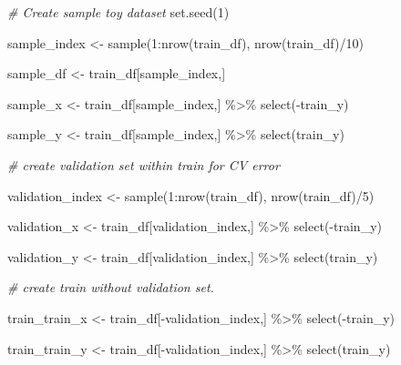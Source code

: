 \documentclass[
]{article}
\newenvironment{Shaded}{\begin{snugshade}}{\end{snugshade}}
\newcommand{\CommentTok}[1]{\textcolor[rgb]{0.56,0.35,0.01}{\textit{#1}}}
\newcommand{\DecValTok}[1]{\textcolor[rgb]{0.00,0.00,0.81}{#1}}
\newcommand{\FunctionTok}[1]{\textcolor[rgb]{0.00,0.00,0.00}{#1}}
\newcommand{\NormalTok}[1]{#1}
\newcommand{\OtherTok}[1]{\textcolor[rgb]{0.56,0.35,0.01}{#1}}
\newcommand{\SpecialCharTok}[1]{\textcolor[rgb]{0.00,0.00,0.00}{#1}}
\begin{document}
\begin{Shaded}
\begin{Highlighting}[]
\CommentTok{\# Create \textquotesingle{}sample\textquotesingle{} toy dataset }
\FunctionTok{set.seed}\NormalTok{(}\DecValTok{1}\NormalTok{)}

\NormalTok{sample\_index }\OtherTok{\textless{}{-}} \FunctionTok{sample}\NormalTok{(}\DecValTok{1}\SpecialCharTok{:}\FunctionTok{nrow}\NormalTok{(train\_df), }\FunctionTok{nrow}\NormalTok{(train\_df)}\SpecialCharTok{/}\DecValTok{10}\NormalTok{)}

\NormalTok{sample\_df }\OtherTok{\textless{}{-}}\NormalTok{ train\_df[sample\_index,]}

\NormalTok{sample\_x }\OtherTok{\textless{}{-}}\NormalTok{ train\_df[sample\_index,] }\SpecialCharTok{\%\textgreater{}\%}
  \FunctionTok{select}\NormalTok{(}\SpecialCharTok{{-}}\NormalTok{train\_y)}

\NormalTok{sample\_y }\OtherTok{\textless{}{-}}\NormalTok{ train\_df[sample\_index,] }\SpecialCharTok{\%\textgreater{}\%}
  \FunctionTok{select}\NormalTok{(train\_y) }

\CommentTok{\# create validation set within train for CV error}

\NormalTok{validation\_index }\OtherTok{\textless{}{-}} \FunctionTok{sample}\NormalTok{(}\DecValTok{1}\SpecialCharTok{:}\FunctionTok{nrow}\NormalTok{(train\_df), }\FunctionTok{nrow}\NormalTok{(train\_df)}\SpecialCharTok{/}\DecValTok{5}\NormalTok{)}

\NormalTok{validation\_x }\OtherTok{\textless{}{-}}\NormalTok{ train\_df[validation\_index,] }\SpecialCharTok{\%\textgreater{}\%}
  \FunctionTok{select}\NormalTok{(}\SpecialCharTok{{-}}\NormalTok{train\_y)}

\NormalTok{validation\_y }\OtherTok{\textless{}{-}}\NormalTok{ train\_df[validation\_index,] }\SpecialCharTok{\%\textgreater{}\%}
  \FunctionTok{select}\NormalTok{(train\_y) }

\CommentTok{\# create train without validation set.}

\NormalTok{train\_train\_x }\OtherTok{\textless{}{-}}\NormalTok{ train\_df[}\SpecialCharTok{{-}}\NormalTok{validation\_index,] }\SpecialCharTok{\%\textgreater{}\%}
  \FunctionTok{select}\NormalTok{(}\SpecialCharTok{{-}}\NormalTok{train\_y)}

\NormalTok{train\_train\_y }\OtherTok{\textless{}{-}}\NormalTok{ train\_df[}\SpecialCharTok{{-}}\NormalTok{validation\_index,] }\SpecialCharTok{\%\textgreater{}\%}
  \FunctionTok{select}\NormalTok{(train\_y) }
\end{Highlighting}
\end{Shaded}
\end{document}
